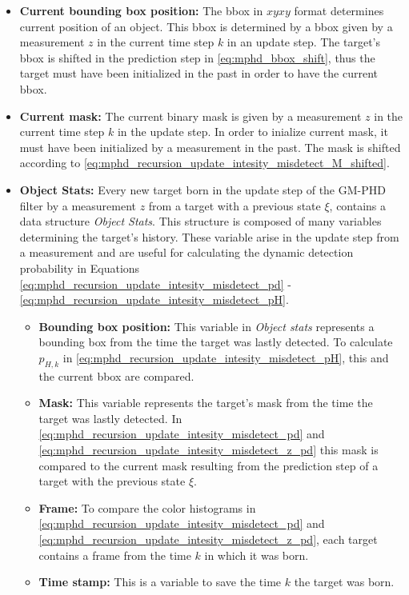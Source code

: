 \begin{itemize}
  \item \textbf{Current bounding box position:} The bbox in $xyxy$ format determines current position of an object.
  This bbox is determined by a bbox given by a measurement $z$ in the current time step $k$ in an update step. The
  target's
  bbox is shifted in the prediction step in \eqref{eq:mphd_bbox_shift}, thus the target must have been initialized in
  the
  past in order to have the current bbox.
  \item \textbf{Current mask:} The current binary mask is given by a measurement $z$ in the current time step $k$ in
  the update
  step. In order to inialize current mask, it must have been initialized by a measurement in
  the past. The mask is shifted according to \eqref{eq:mphd_recursion_update_intesity_misdetect_M_shifted}.
  \item \textbf{Object Stats:} Every new target born in the update step of the GM-PHD filter by a
  measurement $z$ from a target with a previous state $\xi$, contains a data structure \textit{Object Stats}. This
  structure is composed of many variables determining the target's history. These variable arise in the update step from
  a measurement and are useful for calculating the dynamic detection probability in Equations
  \eqref{eq:mphd_recursion_update_intesity_misdetect_pd} - \eqref{eq:mphd_recursion_update_intesity_misdetect_pH}.
      \begin{itemize}
        \item \textbf{Bounding box position:} This variable in \textit{Object stats} represents a bounding box from the time
        the target was lastly detected. To calculate $p_{H,k}$ in
        \eqref{eq:mphd_recursion_update_intesity_misdetect_pH}, this and the current bbox are compared.
        \item \textbf{Mask:} This variable represents the target's mask from the time the target was lastly detected. In \eqref{eq:mphd_recursion_update_intesity_misdetect_pd} and \eqref{eq:mphd_recursion_update_intesity_misdetect_z_pd} this mask is compared to the current mask
        resulting from the prediction step of a target with the previous state $\xi$.
        \item \textbf{Frame:} To compare the color histograms in \eqref{eq:mphd_recursion_update_intesity_misdetect_pd}
        and \eqref{eq:mphd_recursion_update_intesity_misdetect_z_pd}, each target contains a frame from the time $k$
        in which
        it was born.
        \item \textbf{Time stamp:} This is a variable to save the time $k$ the target was born.

\end{itemize}
\end{itemize}
